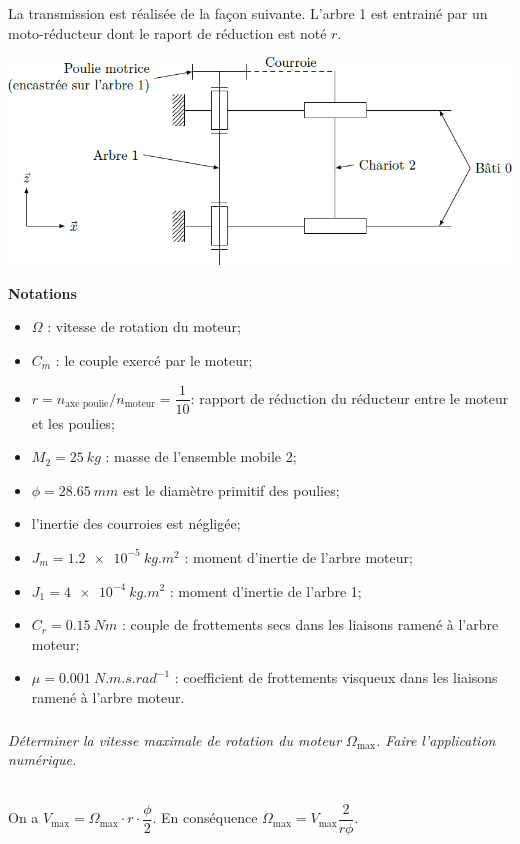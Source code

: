 \documentclass[10pt,fleqn]{article} %
\begin{document}
\begin{multicols}{2}
\ifprof
\else
La transmission est réalisée de la façon suivante. L'arbre 1 est entrainé par un moto-réducteur dont le raport de réduction est noté $r$. 

\begin{center}
\includegraphics[width=\linewidth]{images/fig_05}
\end{center}

\noindent\textbf{Notations}
\begin{itemize}
\item $\Omega$ : vitesse de rotation du moteur;
\item $C_m$ : le couple exercé par le moteur;
\item $r=n_{\text{axe poulie}}/n_{\text{moteur}}=\dfrac{1}{10}$: rapport de réduction du réducteur entre le moteur et les poulies;
\item $M_2 = \SI{25}{kg}$ : masse de l’ensemble mobile 2;
\item $\phi = \SI{28,65}{mm}$ est le diamètre primitif des poulies;
\item l’inertie des courroies est négligée;
\item $J_m = \SI{1,2e-5}{kg.m^2}$ : moment d’inertie de l’arbre moteur;
\item $J_1 = \SI{4e-4}{kg.m^2}$ : moment d’inertie de l’arbre 1;
\item $C_r = \SI{0,15}{Nm}$ : couple de frottements secs dans les liaisons ramené à l’arbre moteur;
\item $\mu = \SI{0,001}{N.m.s.rad^{-1}}$ : coefficient de frottements visqueux dans les liaisons ramené à l’arbre moteur.
\end{itemize}
\fi

\subparagraph{}\textit{Déterminer la vitesse maximale de rotation du moteur $\Omega_{\text{max}}$. Faire l’application numérique.}
\ifprof
\begin{corrige}~\\
On a $V_{\text{max}}=\Omega_{\text{max}}\cdot r \cdot \dfrac{\phi}{2}$. En conséquence 
$\Omega_{\text{max}}=V_{\text{max}}\dfrac{2}{r \phi}$. 


\end{corrige}
\end{multicols}
\end{document}
